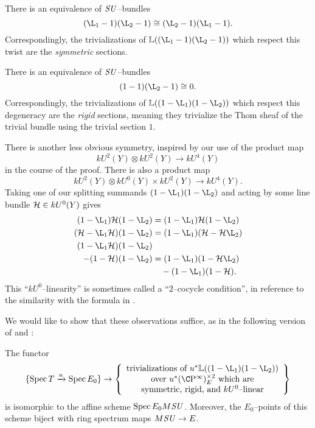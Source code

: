 \begin{example}
There is an equivalence of $\mathit{SU}$--bundles \[(\L_1 - 1)(\L_2 - 1) \cong (\L_2 - 1)(\L_1 - 1).\]  Correspondingly, the trivializations of $\ThomSheaf{(\L_1 - 1)(\L_2 - 1)}$ which respect this twist are the \emph{symmetric} sections.
\end{example}

\begin{example}
There is an equivalence of $\mathit{SU}$--bundles \[(1 - 1)(\L_2 - 1) \cong 0.\]  Correspondingly, the trivializations of $\ThomSheaf{(1 - \L_1)(1 - \L_2)}$ which respect this degeneracy are the \emph{rigid} sections, meaning they trivialize the Thom sheaf of the trivial bundle using the trivial section $1$.
\end{example}

\begin{example}\label{TwoCocycleConditionForBSUBundles}
There is another less obvious symmetry, inspired by our use of the product map \[kU^2(Y) \otimes kU^2(Y) \to kU^4(Y)\] in the course of the proof.  There is also a product map \[kU^2(Y) \otimes kU^0(Y) \times kU^2(Y) \to kU^4(Y).\]  Taking one of our splitting summands $(1 - \L_1)(1 - \L_2)$ and acting by some line bundle $\mathcal{H} \in kU^0(Y)$ gives
\begin{align*}
(1 - \L_1)\sheaf H(1 - \L_2) & = (1 - \L_1)\sheaf H(1 - \L_2) \\
(\sheaf H - \L_1 \sheaf H)(1 - \L_2) & = (1 - \L_1)(\sheaf H - \sheaf H \L_2) \\
(1 - \L_1 \sheaf H)(1 - \L_2) & \\
- (1 - \sheaf H)(1 - \L_2) & = (1 - \L_1)(1 - \sheaf H \L_2) \\
& \quad - (1 - \L_1)(1 - \sheaf H).
\end{align*}
This ``$kU^0$--linearity'' is sometimes called a ``$2$--cocycle condition'', in reference to the similarity with the formula in .
\end{example}

We would like to show that these observations suffice, as in the following version of  and :
\begin{theorem}\label{BSUTriumvirate}
The functor \[\{\Spec T \xrightarrow{u} \Spec E_0\} \to \left\{ \begin{array}{c} \text{trivializations of $u^* \ThomSheaf{(1 - \L_1)(1 - \L_2)}$} \\ \text{over $u^* (\CP^\infty)^{\times 2}_E$ which are} \\ \text{symmetric, rigid, and $kU^0$--linear} \end{array} \right\}\] is isomorphic to the affine scheme $\operatorname{Spec} E_0 M\mathit{SU}$.  Moreover, the $E_0$--points of this scheme biject with ring spectrum maps $M\mathit{SU} \to E$.
\end{theorem}

